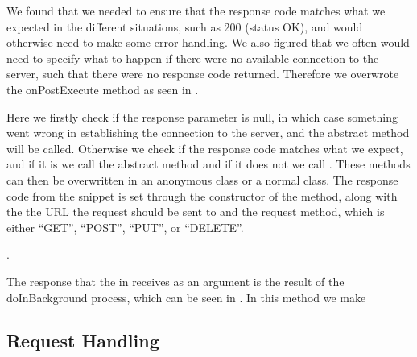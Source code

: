 We found that we needed to ensure that the response code matches what we expected in the different situations, such as 200 (status OK), and would otherwise need to make some error handling. We also figured that we often would need to specify what to happen if there were no available connection to the server, such that there were no response code returned. Therefore we overwrote the onPostExecute method as seen in . 



Here we firstly check if the response parameter is null, in which case something went wrong in establishing the connection to the server, and the abstract method  will be called. Otherwise we check if the response code matches what we expect, and if it is we call the abstract method  and if it does not we call . These methods can then be overwritten in an anonymous class or a normal class. The response code from the snippet is set through the constructor of the method, along with the the URL the request should be sent to and the request method, which is either ``GET'', ``POST'', ``PUT'', or ``DELETE''. 

.

The response that the  in  receives as an argument is the result of the doInBackground process, which can be seen in . In this method we make 





\subsection{Request Handling}
\label{sub:request_handling}


